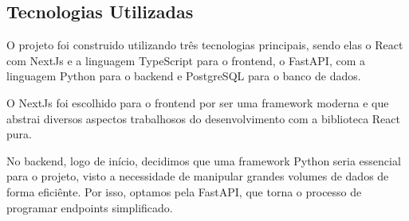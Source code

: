 
\subsection{Tecnologias Utilizadas}
  O projeto foi construido utilizando três tecnologias principais, sendo elas o React\cite{react} com NextJs\cite{nextjs} e a linguagem TypeScript\cite{typescript} para o frontend, o FastAPI\cite{fastapi}, com a linguagem Python\cite{python} para o backend e PostgreSQL\cite{postgresql} para o banco de dados.
  
  O NextJs\cite{nextjs} foi escolhido para o frontend por ser uma framework moderna e que abstrai diversos aspectos trabalhosos do desenvolvimento com a biblioteca React\cite{react} pura.

  No backend, logo de início, decidimos que uma framework Python\cite{python} seria essencial para o projeto, visto a necessidade de manipular grandes volumes de dados de forma eficiênte. Por isso, optamos pela FastAPI\cite{fastapi}, que torna o processo de programar endpoints simplificado.